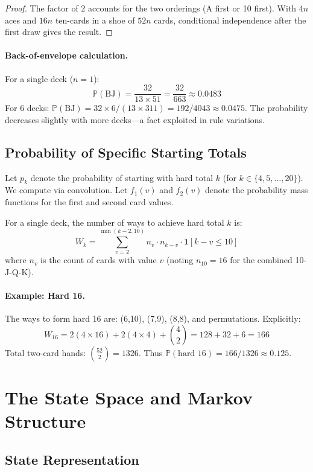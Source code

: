 \documentclass[11pt,a4paper]{article}
\theoremstyle{definition}
\newcommand{\Prob}{\mathbb{P}}
\begin{document}
\begin{proof}
The factor of 2 accounts for the two orderings (A first or 10 first). With $4n$ aces and $16n$ ten-cards in a shoe of $52n$ cards, conditional independence after the first draw gives the result.
\end{proof}

\paragraph{Back-of-envelope calculation.} For a single deck ($n=1$):
\[
\Prob(\text{BJ}) = \frac{32}{13 \times 51} = \frac{32}{663} \approx 0.0483
\]
For 6 decks: $\Prob(\text{BJ}) = 32 \times 6 / (13 \times 311) = 192/4043 \approx 0.0475$. The probability decreases slightly with more decks---a fact exploited in rule variations.

\subsection{Probability of Specific Starting Totals}

Let $p_k$ denote the probability of starting with hard total $k$ (for $k \in \{4, 5, \ldots, 20\}$). We compute via convolution. Let $f_1(v)$ and $f_2(v)$ denote the probability mass functions for the first and second card values.

For a single deck, the number of ways to achieve hard total $k$ is:
\begin{equation}
W_k = \sum_{v=2}^{\min(k-2, 10)} n_v \cdot n_{k-v} \cdot \mathbf{1}[k-v \leq 10]
\end{equation}
where $n_v$ is the count of cards with value $v$ (noting $n_{10} = 16$ for the combined 10-J-Q-K).

\paragraph{Example: Hard 16.} The ways to form hard 16 are: (6,10), (7,9), (8,8), and permutations. Explicitly:
\[
W_{16} = 2(4 \times 16) + 2(4 \times 4) + \binom{4}{2} = 128 + 32 + 6 = 166
\]
Total two-card hands: $\binom{52}{2} = 1326$. Thus $\Prob(\text{hard 16}) = 166/1326 \approx 0.125$.

\section{The State Space and Markov Structure}

\subsection{State Representation}
\end{document}
